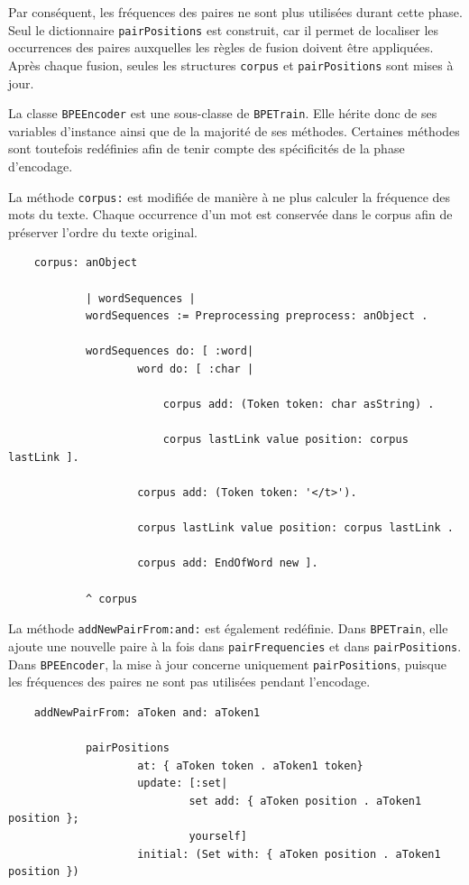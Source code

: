 \documentclass[12pt,a4paper]{report}
\begin{document}
	Par conséquent, les fréquences des paires ne sont plus utilisées durant cette phase. Seul le dictionnaire \texttt{pairPositions} est construit, car il permet de localiser les occurrences des paires auxquelles les règles de fusion doivent être appliquées. Après chaque fusion, seules les structures \texttt{corpus} et \texttt{pairPositions} sont mises à jour.
	
	La classe \texttt{BPEEncoder} est une sous-classe de \texttt{BPETrain}. Elle hérite donc de ses variables d'instance ainsi que de la majorité de ses méthodes. Certaines méthodes sont toutefois redéfinies afin de tenir compte des spécificités de la phase d'encodage.
	
	La méthode \texttt{corpus:} est modifiée de manière à ne plus calculer la fréquence des mots du texte. Chaque occurrence d'un mot est conservée dans le corpus afin de préserver l'ordre du texte original.
	
	\begin{verbatim}
	corpus: anObject
	
			| wordSequences |
			wordSequences := Preprocessing preprocess: anObject .
			
			wordSequences do: [ :word|
					word do: [ :char |
					
						corpus add: (Token token: char asString) .
						
						corpus lastLink value position: corpus lastLink ].
						
					corpus add: (Token token: '</t>').
					
					corpus lastLink value position: corpus lastLink .
					
					corpus add: EndOfWord new ].
					
			^ corpus 
	\end{verbatim}
	
	La méthode \texttt{addNewPairFrom:and:} est également redéfinie. Dans \texttt{BPETrain}, elle ajoute une nouvelle paire à la fois dans \texttt{pairFrequencies} et dans \texttt{pairPositions}. Dans \texttt{BPEEncoder}, la mise à jour concerne uniquement \texttt{pairPositions}, puisque les fréquences des paires ne sont pas utilisées pendant l'encodage.
	
	\begin{verbatim}
	addNewPairFrom: aToken and: aToken1
	
			pairPositions
					at: { aToken token . aToken1 token}
					update: [:set|
							set add: { aToken position . aToken1 position };
							yourself]
					initial: (Set with: { aToken position . aToken1 position })
	\end{verbatim}
	
\end{document}
